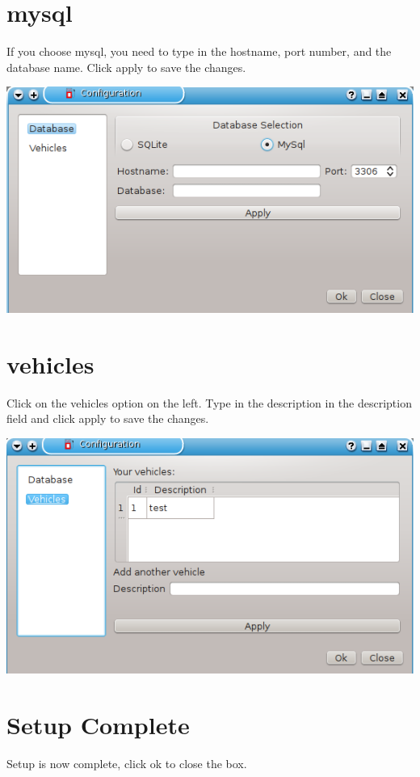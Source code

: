\section{mysql}
If you choose mysql, you need to type in the hostname, port number, and the database name. 
Click apply to save the changes.  
  \begin{center}
    \includegraphics{snapshot3}
  \end{center}
  
\section{vehicles}
Click on the vehicles option on the left.
Type in the description in the description field and click apply to save the changes.
  \begin{center}
    \includegraphics{snapshot4}
  \end{center}

\section{Setup Complete}
Setup is now complete, click ok to close the box.
